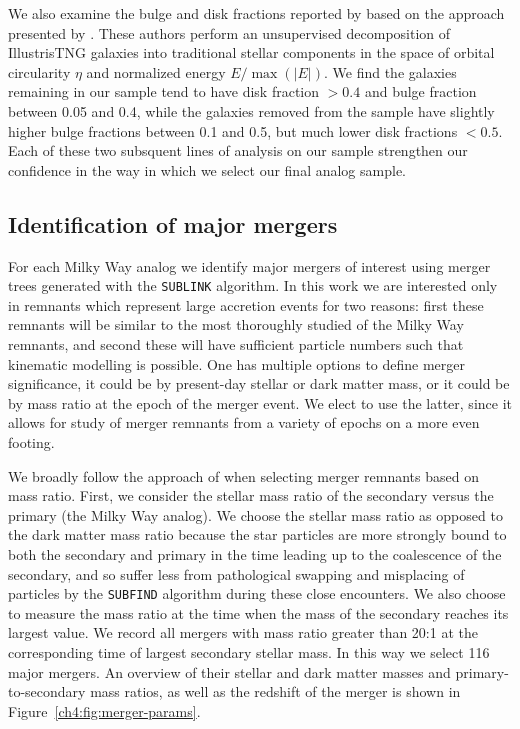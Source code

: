 We also examine the bulge and disk fractions reported by \textcite{du20} based on the approach presented by \textcite{du19}. These authors perform an unsupervised decomposition of IllustrisTNG galaxies into traditional stellar components in the space of orbital circularity $\eta$ and normalized energy $E/\max(\vert E \vert)$. We find the galaxies remaining in our sample tend to have disk fraction $>0.4$ and bulge fraction between 0.05 and 0.4, while the galaxies removed from the sample have slightly higher bulge fractions between 0.1 and 0.5, but much lower disk fractions $<0.5$. Each of these two subsquent lines of analysis on our sample strengthen our confidence in the way in which we select our final analog sample. 

\subsection{Identification of major mergers}

For each Milky Way analog we identify major mergers of interest using merger trees generated with the \texttt{SUBLINK} \parencite{rodriguez-gomez15} algorithm. In this work we are interested only in remnants which represent large accretion events for two reasons: first these remnants will be similar to the most thoroughly studied of the Milky Way remnants, and second these will have sufficient particle numbers such that kinematic modelling is possible. One has multiple options to define merger significance, it could be by present-day stellar or dark matter mass, or it could be by mass ratio at the epoch of the merger event. We elect to use the latter, since it allows for study of merger remnants from a variety of epochs on a more even footing.

We broadly follow the approach of \textcite{rodriguez-gomez16} when selecting merger remnants based on mass ratio. First, we consider the stellar mass ratio of the secondary versus the primary (the Milky Way analog). We choose the stellar mass ratio as opposed to the dark matter mass ratio because the star particles are more strongly bound to both the secondary and primary in the time leading up to the coalescence of the secondary, and so suffer less from pathological swapping and misplacing of particles by the \texttt{SUBFIND} algorithm during these close encounters. We also choose to measure the mass ratio at the time when the mass of the secondary reaches its largest value. We record all mergers with mass ratio greater than 20:1 at the corresponding time of largest secondary stellar mass. In this way we select 116 major mergers. An overview of their stellar and dark matter masses and primary-to-secondary mass ratios, as well as the redshift of the merger is shown in Figure~\ref{ch4:fig:merger-params}.

